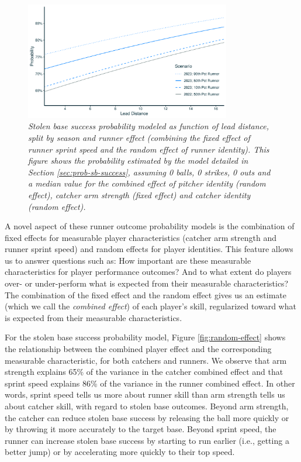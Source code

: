 \documentclass{article}
\begin{document}
      \begin{figure}[H]
        \centering
        \includegraphics[width = 0.8\textwidth]{prob_sb_success_light.pdf}
        \caption{
          \it Stolen base success probability modeled as function of lead distance, split by season and runner effect (combining the fixed effect of runner sprint speed and the random effect of runner identity). This figure shows the probability estimated by the model detailed in Section \ref{sec:prob-sb-success}, assuming 0 balls, 0 strikes, 0 outs and a median value for the combined effect of pitcher identity (random effect), catcher arm strength (fixed effect) and catcher identity (random effect).
        }
        \label{fig:prob-sb-success}
      \end{figure}

      A novel aspect of these runner outcome probability models is the combination of fixed effects for measurable player characteristics (catcher arm strength and runner sprint speed) and random effects for player identities. This feature allows us to answer questions such as: How important are these measurable characteristics for player performance outcomes? And to what extent do players over- or under-perform what is expected from their measurable characteristics? The combination of the fixed effect and the random effect gives us an estimate (which we call the {\it combined effect}) of each player's skill, regularized toward what is expected from their measurable characteristics.

      For the stolen base success probability model, Figure \ref{fig:random-effect} shows the relationship between the combined player effect and the corresponding measurable characteristic, for both catchers and runners. We observe that arm strength explains 65\% of the variance in the catcher combined effect and that sprint speed explains 86\% of the variance in the runner combined effect. In other words, sprint speed tells us more about runner skill than arm strength tells us about catcher skill, with regard to stolen base outcomes. Beyond arm strength, the catcher can reduce stolen base success by releasing the ball more quickly or by throwing it more accurately to the target base. Beyond sprint speed, the runner can increase stolen base success by starting to run earlier (i.e., getting a better jump) or by accelerating more quickly to their top speed.
      
\end{document}
